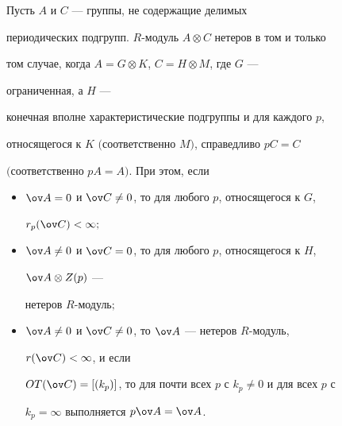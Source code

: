 \begin{thms} 


Пусть $A$ и $C$ --- группы, не содержащие делимых 


периодических подгрупп.\; $R$-модуль $A\otimes C$ нетеров в том и только 


том случае, когда $A=G\otimes K$, $C=H\otimes M$, где $G$ --- 


ограниченная, а $H$ --- 


конечная вполне характеристические подгруппы и для каждого $p$, 


относящегося к $K$ $($соответственно $M)$, справедливо $p C=C$ 


$($соответственно $pA=A)$. При этом, если 


\begin{itemize} 


\item[а)] $\ov A=0$ и $\ov C\ne0$, то для любого $p$, относящегося к $G$, 


$r_p(\ov C)<\infty;$ 


\item[б)] $\ov A\ne0$ и $\ov C=0$, то для любого $p$, относящегося к $H$, 


$\ov A\otimes Z(p)$ --- 


нетеров $R$-модуль$;$ 


\item[в)] $\ov A\ne0$ и $\ov C\ne0$, то $\ov A$ --- нетеров $R$-модуль, 


$r(\ov C)<\infty$, и если 


$OT(\ov C)=[(k_p)]$, то для почти всех $p$ с $k_p\ne0$ и для всех $p$ с 


$k_p=\infty$ выполняется $p\ov A=\ov A$. 


\end{itemize} 


\end{thms} 


 


